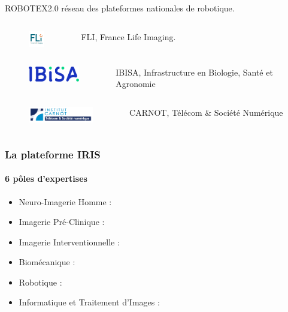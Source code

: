 \begin{frame}
\begin{columns}
            ROBOTEX2.0 réseau des plateformes nationales  de robotique.
    \end{columns}
    \begin{columns}
            \begin{figure}[!h]
                \centering
                \includegraphics[height=0.7cm]{logos/reseaux_labelisation/FLI_Logotype_Coul-5cm.jpg}
            \end{figure} 
            FLI, France Life Imaging.
    \end{columns}
    \begin{columns}
            \begin{figure}[!h]
                \centering
                \includegraphics[height=0.7cm]{logos/reseaux_labelisation/IBISA.png}
            \end{figure} 
            IBISA, Infrastructure en Biologie, Santé et Agronomie
    \end{columns}
    \begin{columns}
            \begin{figure}[!h]
                \centering
                \includegraphics[height=0.7cm]{logos/reseaux_labelisation/logo Carnot TSN.jpg}
            \end{figure} 
            CARNOT, Télécom \& Société Numérique
    \end{columns}
\end{frame}

\begin{frame}
    \frametitle{La plateforme IRIS}
    \framesubtitle{6 pôles d'expertises}
    \begin{itemize}
        \item Neuro-Imagerie Homme :
        \item Imagerie Pré-Clinique :
        \item Imagerie Interventionnelle :
        \item Biomécanique :
        \item Robotique :
        \item Informatique et Traitement d'Images :
    \end{itemize}
\end{frame}